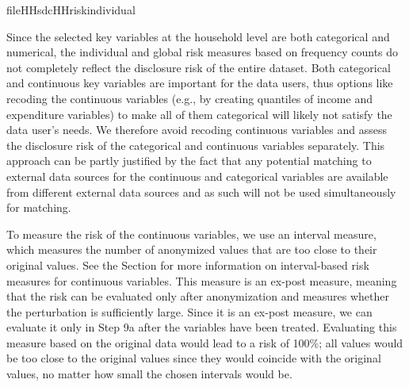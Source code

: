 \documentclass[letterpaper,10pt,english]{sphinxmanual}
\begin{document}
\def\sphinxLiteralBlockLabel{\label{\detokenize{case_studies:code913}}}
%
\begin{sphinxVerbatim}[commandchars=\\\{\},numbers=left,firstnumber=1,stepnumber=1]
fileHH\PYG{p}{[}sdcHHriskindividual\PYG{p}{[} \PYG{p}{]}  \PYG{p}{]}
\end{sphinxVerbatim}

Since the selected key variables at the household level are both
categorical and numerical, the individual and global risk measures based
on frequency counts do not completely reflect the disclosure risk of the
entire dataset. Both categorical and continuous key variables are
important for the data users, thus options like recoding the continuous
variables (e.g., by creating quantiles of income and expenditure
variables) to make all of them categorical will likely not satisfy the
data user’s needs. We therefore avoid recoding continuous variables and
assess the disclosure risk of the categorical and continuous variables
separately. This approach can be partly justified by the fact that any
potential matching to external data sources for the continuous and
categorical variables are available from different external data sources
and as such will not be used simultaneously for matching.


To measure the risk of the continuous variables, we use an interval
measure, which measures the number of anonymized values that are too
close to their original values. See the Section 
for more information
on interval-based risk measures for continuous variables. This measure
is an ex-post measure, meaning that the risk can be evaluated only after
anonymization and measures whether the perturbation is sufficiently
large. Since it is an ex-post measure, we can evaluate it only in Step
9a after the variables have been treated. Evaluating this measure based
on the original data would lead to a risk of 100\%; all values would be
too close to the original values since they would coincide with the
original values, no matter how small the chosen intervals would be.
\end{document}
